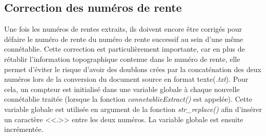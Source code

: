 \subsection{Correction des numéros de rente}
Une fois les numéros de rentes extraits, ils doivent encore être corrigés pour défaire le numéro de rente du numéro de rente successif au sein d'une même connétablie. Cette correction est particulièrement importante, car en plus de rétablir l'information topographique contenue dans le numéro de rente, elle permet d'éviter le risque d'avoir des doublons crées par la concaténation des deux numéros lors de la conversion du document source en format texte(\textit{.txt}).
Pour cela, un compteur est initialisé  dans une variable globale à chaque nouvelle connétablie traitée (lorsque la fonction \textit{connetablieExtract()} est appelée). 
Cette variable globale est utilisée en argument de la fonction \textit{str\_replace()} afin d'insérer un caractère <<.>> entre les deux numéros. La variable globale est ensuite incrémentée.

